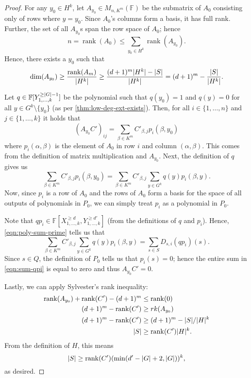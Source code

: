 \documentclass[english]{reedthesis}
\theoremstyle{plain}
\theoremstyle{definition}
\theoremstyle{remark}
\DeclareMathOperator{\rk}{rank}
\DeclarePairedDelimiter{\abs}{\lvert}{\rvert}
\begin{document}
\begin{proof}
  For any $y_{0} \in H^{k}$, let $A_{y_{0}} \in M_{n,K^{m}}(\mathbb{F})$ be the
  submatrix of $A_{0}$ consisting only of rows where $y = y_{0}$.
  Since $A_{0}$'s columns form a basis, it has full rank. Further, the set of
  all $A_{y_{0}}$s span the row space of $A_{0}$; hence
  \[
    n = \rk(A_{0}) \le \sum_{y_{0} \in H^{k}}\rk(A_{y_{0}}).
  \]
  Hence, there exists a $y_{0}$ such that
  \[
    \dim(A_{y_{0}}) \ge \frac{\rk(A_{m})}{\abs{H^{k}}}
    \ge \frac{(d+1)^{m}\abs{H^{k}} - \abs{S}}{\abs{H^{k}}} = (d+1)^{m} - \frac{\abs{S}}{\abs{H^{k}}}.
  \]

  Let $q \in \mathbb{F}[Y_{1, \ldots, k}^{\ge \abs{G} - 1}]$ be the polynomial such that
  $q(y_{0}) = 1$ and $q(y) = 0$ for all $y \in G^{k} \setminus \{y_{0}\}$ (as per
  \cref{thm:low-deg-ext-exists}). Then, for all $i \in \{1, \ldots, n\}$ and
  $j \in \{1, \ldots, k\}$ it holds that
  \begin{equation}
    (A_{y_{0}}C')_{ij} = \sum_{\beta \in K^{m}}C'_{\beta,j}p_{i}(\beta, y_{0})
  \end{equation}
  where $p_{i}(\alpha, \beta)$ is the element of $A_{0}$ in row $i$ and column $(\alpha,\beta)$.
  This comes from the definition of matrix multiplication and $A_{y_{0}}$. Next,
  the definition of $q$ gives us
  \begin{equation}
    \sum_{\beta \in K^{m}}C'_{\beta,j}p_{i}(\beta, y_{0}) = \sum_{\beta \in K^{m}}C'_{\beta,j}\sum_{y \in G^{k}}q(y)p_{i}(\beta,y).
  \end{equation}
  Now, since $p_{i}$ is a row of $A_{0}$ and the rows of $A_{0}$ form a basis
  for the space of all outputs of polynomials in $P_{0}$, we can simply treat
  $p_{i}$ as a polynomial in $P_{0}$.

  Note that $qp_{i} \in \mathbb{F}[X_{1, \ldots, k}^{\ge d}, Y_{1, \ldots, k}^{\ge d'}]$ (from
  the definitions of $q$ and $p_{i}$). Hence, \cref{eqn:poly-sum-prime} tells us
  that
  \begin{equation}\label{eqn:sum-qpi}
    \sum_{\beta \in K^{m}}C'_{\beta,j}\sum_{y \in G^{k}}q(y)p_{i}(\beta,y) = \sum_{s \in S}D_{s,i}(qp_{i})(s).
  \end{equation}
  Since $s \in Q$, the definition of $P_{0}$ tells us that $p_{i}(s) = 0$; hence
  the entire sum in \cref{eqn:sum-qpi} is equal to zero and thus
  $A_{y_{0}}C' = 0$.

  Lastly, we can apply Sylvester's rank inequality:
  \begin{align*}
    \rk(A_{y_{0}}) + \rk(C') - (d+1)^{m} &\le \rk(0) \\
    (d+1)^{m} - \rk(C') &\ge rk(A_{y_{0}}) \\
    (d+1)^{m} - \rk(C') &\ge (d+1)^{m} - \abs{S}/\abs{H}^{k} \\
    \abs{S} &\ge \rk(C')\abs{H}^{k}.
  \end{align*}
  From the definition of $H$, this means
  \[
    \abs{S} \ge \rk(C')(\min(d' - \abs{G} + 2, \abs{G}))^{k},
  \]
  as desired.
\end{proof}
\end{document}
